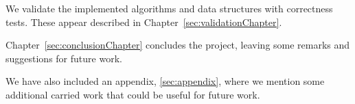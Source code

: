 We validate the implemented algorithms and data structures with correctness tests. These appear described in Chapter~\ref{sec:validationChapter}.

Chapter~\ref{sec:conclusionChapter} concludes the project, leaving some remarks and suggestions for future work.

We have also included an appendix, \ref{sec:appendix}, where we mention some additional carried work that could be useful for future work.

